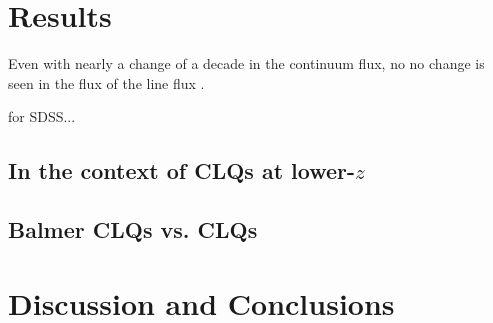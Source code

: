 \documentclass[a4paper,fleqn,usenatbib]{mnras}
\begin{document}
\section{Results}
Even with nearly a change of a decade in the continuum flux, no 
no change is seen in the flux of the \civ line flux \citet[e.g. Figure 6 in ][]{Hawkins2011}. 

\citep{Wilhite2006} for SDSS... 


\subsection{In the context of CLQs at lower-$z$}

\subsection{Balmer CLQs vs. \civ CLQs}



\section{Discussion and Conclusions}





\bsp	%
\label{lastpage}
\end{document}

